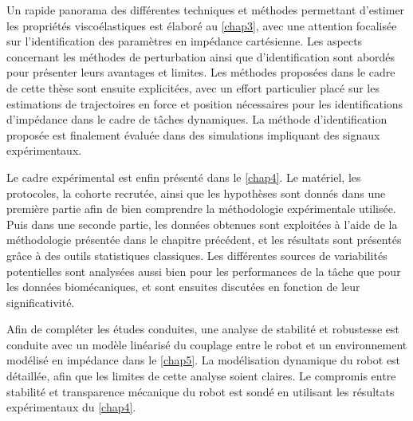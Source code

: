 Un rapide panorama des différentes techniques et méthodes permettant d'estimer les propriétés viscoélastiques est élaboré au \cref{chap3}, avec une attention focalisée sur l'identification des paramètres en impédance cartésienne. Les aspects concernant les méthodes de perturbation ainsi que d'identification sont abordés pour présenter leurs avantages et limites. Les méthodes proposées dans le cadre de cette thèse sont ensuite explicitées, avec un effort particulier placé sur les estimations de trajectoires en force et position nécessaires pour les identifications d'impédance dans le cadre de tâches dynamiques. La méthode d'identification proposée est finalement évaluée dans des simulations impliquant des signaux expérimentaux.

Le cadre expérimental est enfin présenté dans le \cref{chap4}. Le matériel, les protocoles, la cohorte recrutée, ainsi que les hypothèses sont donnés dans une première partie afin de bien comprendre la méthodologie expérimentale utilisée. Puis dans une seconde partie, les données obtenues sont exploitées à l'aide de la méthodologie présentée dans le chapitre précédent, et les résultats sont présentés grâce à des outils statistiques classiques. Les différentes sources de variabilités potentielles sont analysées aussi bien pour les performances de la tâche que pour les données biomécaniques, et sont ensuites discutées en fonction de leur significativité.

Afin de compléter les études conduites, une analyse de stabilité et robustesse est conduite avec un modèle linéarisé du couplage entre le robot et un environnement modélisé en impédance dans le \cref{chap5}. La modélisation dynamique du robot est détaillée, afin que les limites de cette analyse soient claires. Le compromis entre stabilité et transparence mécanique du robot est sondé en utilisant les résultats expérimentaux du \cref{chap4}.




%

